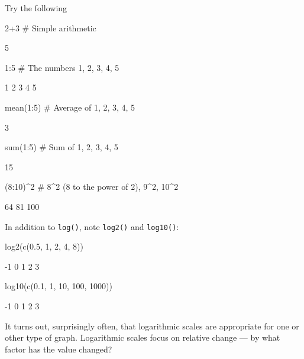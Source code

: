 \documentclass{tufte-book}\usepackage[]{graphicx}\usepackage[]{color}
\newcommand{\txtt}[1]{\texttt{#1}}
\begin{document}
Try the following
\begin{Schunk}
\begin{Sinput}
2+3        # Simple arithmetic
\end{Sinput}
\begin{Soutput}
[1] 5
\end{Soutput}
\begin{Sinput}
1:5        # The numbers 1, 2, 3, 4, 5
\end{Sinput}
\begin{Soutput}
[1] 1 2 3 4 5
\end{Soutput}
\begin{Sinput}
mean(1:5)  # Average of 1, 2, 3, 4, 5
\end{Sinput}
\begin{Soutput}
[1] 3
\end{Soutput}
\begin{Sinput}
sum(1:5)   # Sum of 1, 2, 3, 4, 5
\end{Sinput}
\begin{Soutput}
[1] 15
\end{Soutput}
\begin{Sinput}
(8:10)^2   # 8^2 (8 to the power of 2), 9^2, 10^2
\end{Sinput}
\begin{Soutput}
[1]  64  81 100
\end{Soutput}
\end{Schunk}

In addition to \txtt{log()}, note \txtt{log2()} and \txtt{log10()}:
\begin{Schunk}
\begin{Sinput}
log2(c(0.5, 1, 2, 4, 8))
\end{Sinput}
\begin{Soutput}
[1] -1  0  1  2  3
\end{Soutput}
\begin{Sinput}
log10(c(0.1, 1, 10, 100, 1000))
\end{Sinput}
\begin{Soutput}
[1] -1  0  1  2  3
\end{Soutput}
\end{Schunk}
\noindent
It turns out, surprisingly often, that logarithmic scales are
appropriate for one or other type of graph.  Logarithmic scales focus
on relative change --- by what factor has the value changed?
\end{document}
